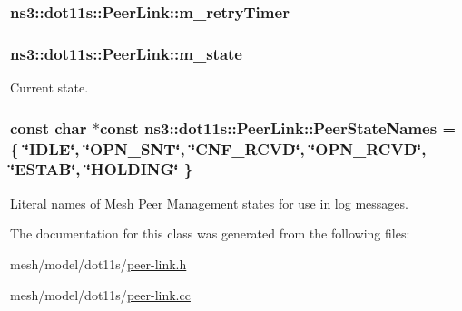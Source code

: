 \subsubsection[{\texorpdfstring{m\+\_\+retry\+Timer}{m_retryTimer}}]{ ns3\+::dot11s\+::\+Peer\+Link\+::m\+\_\+retry\+Timer\hspace{0.3cm}{\ttfamily [private]}}\hypertarget{classns3_1_1dot11s_1_1PeerLink_a8c07f1850cc7c0cd2077ce904f376dfb}{}\label{classns3_1_1dot11s_1_1PeerLink_a8c07f1850cc7c0cd2077ce904f376dfb}
\subsubsection[{\texorpdfstring{m\+\_\+state}{m_state}}]{ ns3\+::dot11s\+::\+Peer\+Link\+::m\+\_\+state\hspace{0.3cm}{\ttfamily [private]}}\hypertarget{classns3_1_1dot11s_1_1PeerLink_a787dbb5c8b201a6f0bb92650b67807ef}{}\label{classns3_1_1dot11s_1_1PeerLink_a787dbb5c8b201a6f0bb92650b67807ef}


Current state. 

\subsubsection[{\texorpdfstring{Peer\+State\+Names}{PeerStateNames}}]{\setlength{\rightskip}{0pt plus 5cm}const char $\ast$const ns3\+::dot11s\+::\+Peer\+Link\+::\+Peer\+State\+Names = \{ \char`\"{}I\+D\+LE\char`\"{}, \char`\"{}{\bf O\+P\+N\+\_\+\+S\+NT}\char`\"{}, \char`\"{}{\bf C\+N\+F\+\_\+\+R\+C\+VD}\char`\"{}, \char`\"{}{\bf O\+P\+N\+\_\+\+R\+C\+VD}\char`\"{}, \char`\"{}{\bf E\+S\+T\+AB}\char`\"{}, \char`\"{}{\bf H\+O\+L\+D\+I\+NG}\char`\"{} \}\hspace{0.3cm}{\ttfamily [static]}}\hypertarget{classns3_1_1dot11s_1_1PeerLink_a4e871141b7dfb68a996542b86fe1e893}{}\label{classns3_1_1dot11s_1_1PeerLink_a4e871141b7dfb68a996542b86fe1e893}


Literal names of Mesh Peer Management states for use in log messages. 



The documentation for this class was generated from the following files\+:\begin{DoxyCompactItemize}
\item 
mesh/model/dot11s/\hyperlink{peer-link_8h}{peer-\/link.\+h}\item 
mesh/model/dot11s/\hyperlink{peer-link_8cc}{peer-\/link.\+cc}\end{DoxyCompactItemize}
